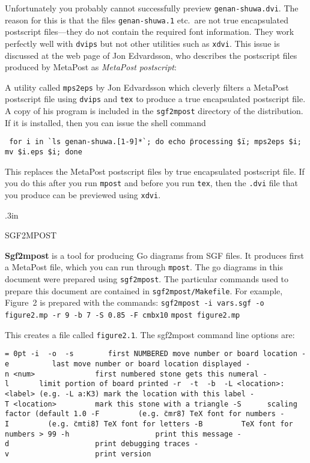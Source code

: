 Unfortunately you probably cannot successfully preview
{\tt genan-shuwa.dvi}. The reason for this is that the
files {\tt genan-shuwa.1} etc.\ are not true encapsulated
postscript files---they do not contain the required font
information. They work perfectly well with {\tt dvips}
but not other utilities such as {\tt xdvi}. This issue
is discussed at the web page of Jon Edvardsson, who
describes the postscript files produced by MetaPost as
{\it MetaPost postscript}:

\medbreak
\centerline{}
\medbreak

A utility called {\tt mps2eps} by Jon Edvardsson which
cleverly filters a MetaPost post\-script file using
{\tt dvips} and {\tt tex} to produce a true encapsulated
postscript file. A copy of his program is included in
the {\tt sgf2mpost} directory of the distribution. If
it is installed, then you can issue the shell command

\medbreak
{\tt\obeylines\obeyspaces
for i in \`{}ls genan-shuwa.[1-9]*\`{}; do
echo \"{}processing \$i\"{};
mps2eps \$i;
mv \$i.eps \$i; 
done
}
\medbreak

\noindent
This replaces the MetaPost postscript files by true
encapsulated postscript file. If you
do this after you run {\tt mpost} and before you run {\tt tex},
then the {\tt .dvi} file that you produce can be previewed
using {\tt xdvi}.

\vglue.3in

\centerline{\titlefont SGF2MPOST}
\medbreak

{\bf Sgf2mpost} is a tool for producing Go diagrams from SGF files.
It produces first a MetaPost file, which you can run through {\tt mpost}.
The go diagrams in this document were prepared using {\tt sgf2mpost}. 
The particular commands used to prepare this document are contained in
{\tt sgf2mpost/Makefile}. For example, Figure~2 is prepared with the commands:
\medbreak
{\parindent=0pt\obeylines
{\tt sgf2mpost -i vars.sgf -o figure2.mp -r 9 -b 7 -S 0.85 -F cmbx10}
{\tt mpost figure2.mp}
}
\medbreak

This creates a file called {\tt figure2.1}. The sgf2mpost command line options
are:

\medbreak
{\tt \obeylines\parindent = 0pt
-i\ <input file>
-o\ <output file>
-s\ <start move>\ \ \ \ \ \ \ first NUMBERED move number or board location
-e\ <end move>\ \ \ \ \ \ \ \ \ last move number or board location displayed
-n\ <num>\ \ \ \ \ \ \ \ \ \ \ \ \ \ first numbered stone gets this numeral
-l\ <left column>\ \ \ \ \ \ limit portion of board printed
-r\ <right column>
-t\ <top row>
-b\ <bottom row>
-L\ <location>:<label>\ (e.g.\ -L a:K3) mark the location with this label
-T\ <location>\ \ \ \ \ \ \ \ \ mark this stone with a triangle
-S\ <scale factor>\ \ \ \ \ scaling factor (default 1.0
-F\ <font name>\ \ \ \ \ \ \ \ (e.g. \"{}cmr8\"{}) TeX font for numbers
-I\ <font name>\ \ \ \ \ \ \ \ (e.g. \"{}cmti8\"{}) TeX font for letters
-B\ <font name>\ \ \ \ \ \ \ \ TeX font for numbers > 99
-h\ \ \ \ \ \ \ \ \ \ \ \ \ \ \ \ \ \ \ \ print this message
-d\ \ \ \ \ \ \ \ \ \ \ \ \ \ \ \ \ \ \ \ print debugging traces
-v\ \ \ \ \ \ \ \ \ \ \ \ \ \ \ \ \ \ \ \ print version
}
\medbreak

